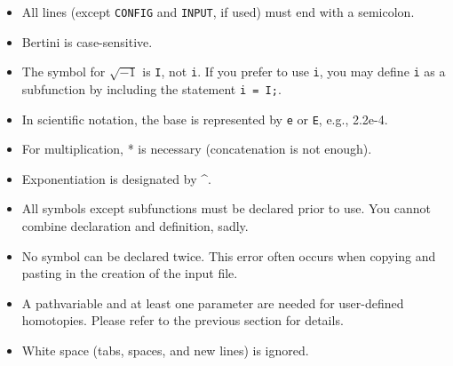\begin{itemize}
\item All lines (except \texttt{CONFIG} and \texttt{INPUT}, if used) must end with a semicolon.
\item Bertini is case-sensitive.
\item The symbol for $\sqrt{-1}$ is \texttt{I}, not \texttt{i}. If you prefer to use \texttt{i}, you may define \texttt{i} as a subfunction by
including the statement \texttt{i = I;}.
\item In scientific notation, the base is represented by \texttt{e} or {\tt E}, e.g., 2.2e-4. 
\item For multiplication, * is necessary (concatenation is not enough).
\item Exponentiation is designated by \string^.
\item All symbols except subfunctions must be declared prior to use.  You cannot combine declaration and definition, sadly.
\item No symbol can be declared twice. This error often occurs when copying and pasting in the
creation of the input file.
\item A pathvariable and at least one parameter are needed for user-defined homotopies. Please
refer to the previous section for details.
\item White space (tabs, spaces, and new lines) is ignored.
\end{itemize}

